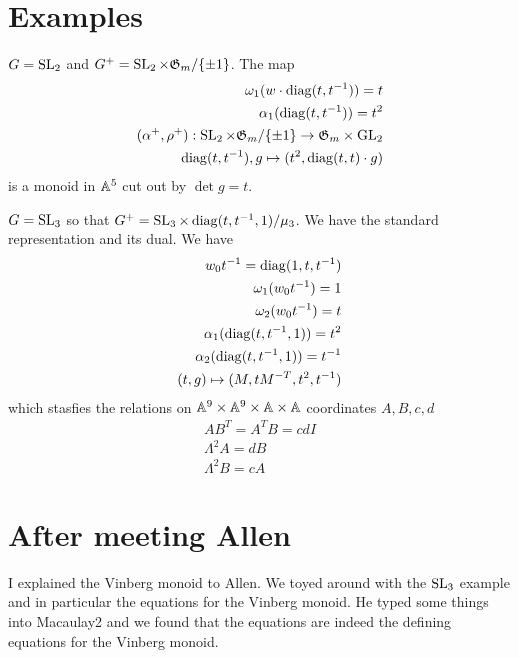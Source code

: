 \documentclass[12pt]{article}
\begin{document}
\section{Examples}
\begin{example}
    $G = \operatorname{SL}_2$ and $G^+ = \operatorname{SL}_2\times \mathfrak{G}_m/\{\pm 1\}$. The map \begin{align*}
        \omega_1(w\cdot \operatorname{diag}(t, t^{-1})) = t \\
        \alpha_1(\operatorname{diag}(t, t^{-1})) = t^2 \\
        (\alpha^+, \rho^+):\operatorname{SL}_2\times \mathfrak{G}_m/\{\pm 1\}\to \mathfrak{G}_m\times \operatorname{GL}_2 \\
        \operatorname{diag}(t, t^{-1}),g \mapsto (t^2, \operatorname{diag}(t, t)\cdot g)
    \end{align*}
    is a monoid in $\mathbb{A}^5$ cut out by $\det g = t$.
\end{example}


\begin{example}
    $G = \operatorname{SL}_3$ so that $G^+ = \operatorname{SL}_3\times \operatorname{diag}(t,{t}^{-1},1)/\mu_3$. We have the standard representation and 
    its dual. We have \begin{align*}
        w_0t^{-1} = \operatorname{diag}(1,t,{t}^{-1}) \\
        \omega_1(w_0t^{-1}) = 1\\
        \omega_2(w_0t^{-1}) = t\\
        \alpha_1(\operatorname{diag}(t,{t}^{-1},1)) = t^2\\
        \alpha_2(\operatorname{diag}(t,{t}^{-1},1)) = {t}^{-1}\\
        (t,g)\mapsto (M,tM^{-T},t^2,{t}^{-1})
    \end{align*} which stasfies the relations on $\mathbb{A}^9\times\mathbb{A}^9\times \mathbb{A}\times \mathbb{A}$ coordinates $A,B,c,d$ 
    \begin{align*}
        AB^T = A^TB = cdI \\
        \Lambda^2 A = dB \\
        \Lambda^2 B = cA
    \end{align*}
\end{example}


\section{After meeting Allen}
I explained the Vinberg monoid to Allen. We toyed around with the $\operatorname{SL}_3$ example and in particular the equations
for the Vinberg monoid. He typed some things into Macaulay2 and we found that the equations are indeed the 
defining equations for the Vinberg monoid.
\end{document}
